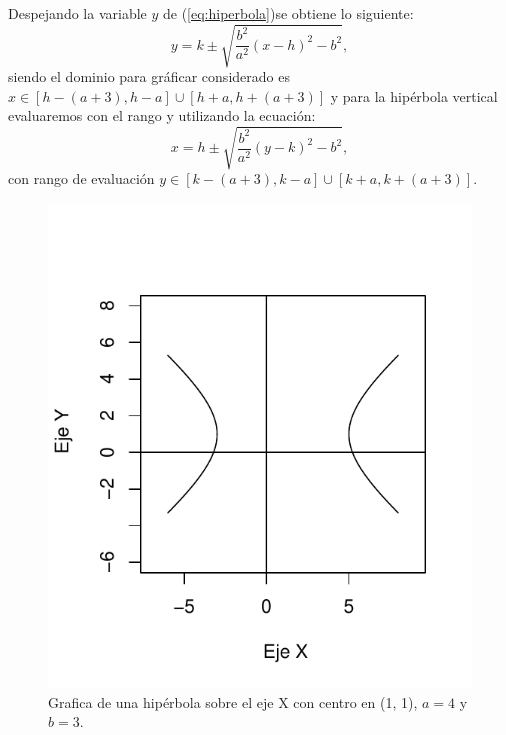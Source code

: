 \documentclass[12pt,a4paper]{report}
\begin{document}
\citep{geometria} Despejando la variable $y$  de (\ref{eq:hiperbola})se obtiene lo siguiente:
\begin{equation}
y = k \pm \sqrt{\frac{b^2}{a^2}(x - h)^2 - b^2}, \label{eq:hiperbolahor}
\end{equation}
siendo el dominio para gráficar considerado es $x \in [h - (a + 3), h - a] \cup [h + a, h + (a + 3)]$ y para la  hipérbola vertical evaluaremos con el rango y utilizando la ecuación:
\begin{equation}
x = h \pm \sqrt{\frac{b^2}{a^2}(y - k)^2 - b^2}, \label{eq:hiperobolav}
\end{equation}
con rango de evaluación $y \in [k - (a + 3), k - a] \cup [k + a, k + (a + 3)]$.

\begin{figure}
\centering
\includegraphics[scale=0.9]{Hiperbola1}
\caption{Grafica de una hipérbola sobre el eje X con centro en (1, 1), $a = 4$ y $b = 3$.}
\label{fig:Hiperbola1}
\end{figure}
\end{document}
